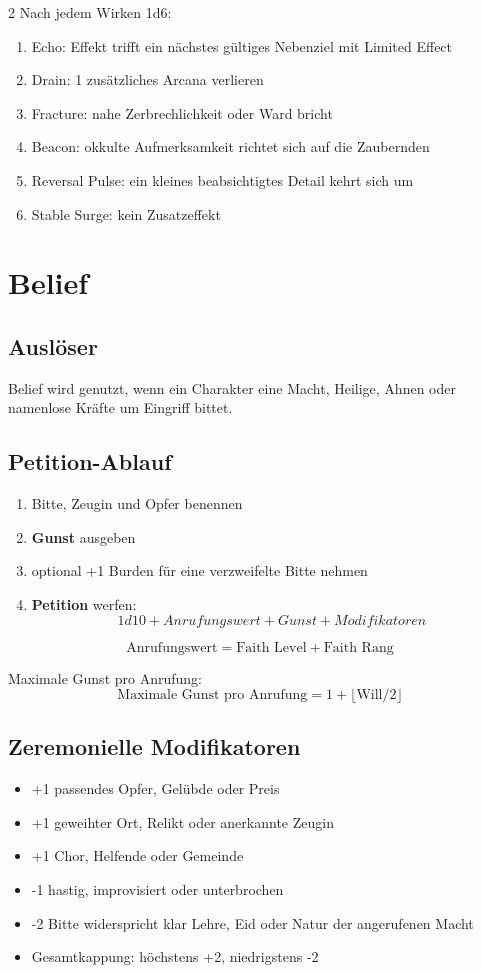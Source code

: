 \begin{multicols*}{2}
Nach jedem Wirken 1d6:
\begin{enumerate}[leftmargin=*]
\item Echo: Effekt trifft ein nächstes gültiges Nebenziel mit Limited Effect
\item Drain: 1 zusätzliches Arcana verlieren
\item Fracture: nahe Zerbrechlichkeit oder Ward bricht
\item Beacon: okkulte Aufmerksamkeit richtet sich auf die Zaubernden
\item Reversal Pulse: ein kleines beabsichtigtes Detail kehrt sich um
\item Stable Surge: kein Zusatzeffekt
\end{enumerate}

\section{Belief}
\subsection{Auslöser}
Belief wird genutzt, wenn ein Charakter eine Macht, Heilige, Ahnen oder namenlose Kräfte um Eingriff bittet.

\subsection{Petition-Ablauf}
\begin{enumerate}[leftmargin=*]
\item Bitte, Zeugin und Opfer benennen
\item \textbf{Gunst} ausgeben
\item optional +1 Burden für eine verzweifelte Bitte nehmen
\item \textbf{Petition} werfen:
\[
1d10 + Anrufungswert + Gunst + Modifikatoren
\]
\end{enumerate}

\[
\text{Anrufungswert} = \text{Faith Level} + \text{Faith Rang}
\]

Maximale Gunst pro Anrufung:
\[
\text{Maximale Gunst pro Anrufung} = 1 + \lfloor \text{Will} / 2 \rfloor
\]

\subsection{Zeremonielle Modifikatoren}
\begin{itemize}[leftmargin=*]
\item +1 passendes Opfer, Gelübde oder Preis
\item +1 geweihter Ort, Relikt oder anerkannte Zeugin
\item +1 Chor, Helfende oder Gemeinde
\item -1 hastig, improvisiert oder unterbrochen
\item -2 Bitte widerspricht klar Lehre, Eid oder Natur der angerufenen Macht
\item Gesamtkappung: höchstens +2, niedrigstens -2
\end{itemize}


\end{multicols*}
